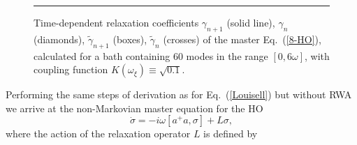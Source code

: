 \documentclass[12pt,twoside,a4paper]{report}
\begin{document}
\footnotesize\begin{figure}[ht]\centering
  \parbox{10cm}
  {\rule{-2cm}{0cm}
\epsfxsize=12cm}
   \caption[Time-dependent relaxation coefficients]
  {\small Time-dependent relaxation coefficients
   $\gamma_{n+1}$ (solid line), 
   $\gamma_n$     (diamonds),
   $\tilde \gamma_{n+1}$ (boxes),
   $\tilde \gamma_n$ (crosses)
   of the master Eq.~(\ref{8-HO}), 
   calculated for a bath containing
   60 modes in the range $[0,6\omega]$,
   with coupling function
   $K(\omega_\xi) \equiv \sqrt{0.1}$.
   \label{fig0}}
\end{figure}\normalsize
Performing the same steps of derivation 
as for Eq.~(\ref{Louisell})
but without RWA
we arrive at the non-Markovian master equation for the HO
\begin{equation}
\dot
{\sigma}
        =
          -  {i}
             \omega 
             \left[ 
                  a^{+}a,\sigma 
             \right] 
          +  L\sigma ,
  \label{8-HO}
\end{equation}
where the action of the relaxation operator $L$ is defined by
\end{document}
